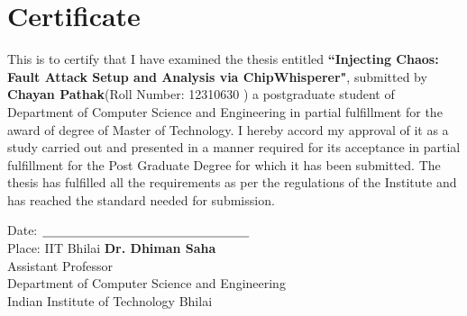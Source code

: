\chapter{Certificate}
\thispagestyle{myHeader}
\begin{Spacing}{1.5}
\sffamily
This is to certify that I have examined the thesis entitled \textbf{``Injecting Chaos: Fault Attack Setup and Analysis via ChipWhisperer"}, submitted by \textbf{Chayan Pathak}(Roll Number: 12310630 ) a postgraduate student of Department of Computer Science and Engineering in partial fulfillment for the award of degree of Master of Technology. I hereby accord my approval of it as a study carried out and presented in a manner required for its acceptance in partial fulfillment for the Post Graduate Degree for which it has been
submitted. The thesis has fulfilled all the requirements as per the regulations of the Institute and has reached the standard needed for submission.

\end{Spacing}




\vspace{2cm}



\noindent
Date: \hspace{0pt plus 1filll} $\underline{\hspace{5.8cm}}$\\
Place: IIT Bhilai \hspace{0pt plus 1filll} \textbf{Dr. Dhiman Saha}\\
\hspace*{0pt plus 1filll} Assistant Professor\\
\hspace*{0pt plus 1filll} Department of Computer Science and Engineering\\
\hspace*{0pt plus 1filll} Indian Institute of Technology Bhilai


